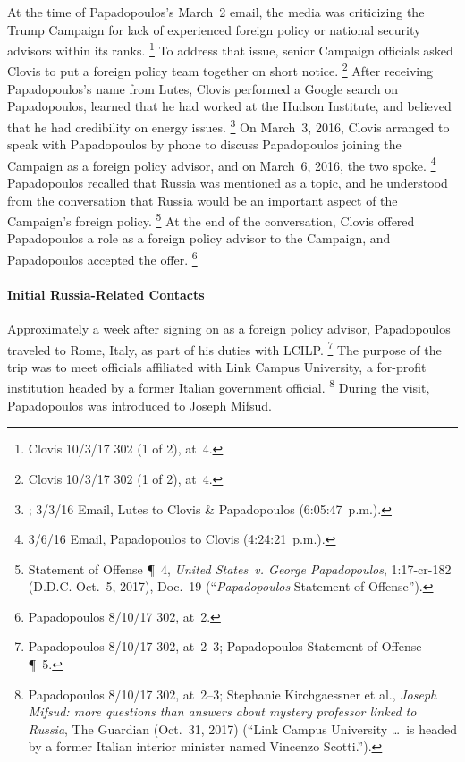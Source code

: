 At the time of Papadopoulos's March~2 email, the media was criticizing the Trump Campaign for lack of experienced foreign policy or national security advisors within its ranks.%
\footnote{Clovis 10/3/17 302 (1 of 2), at~4.}
To address that issue, senior Campaign officials asked Clovis to put a foreign policy team together on short notice.%
\footnote{Clovis 10/3/17 302 (1 of 2), at~4.}
After receiving Papadopoulos's name from Lutes, Clovis performed a Google search on Papadopoulos, learned that he had worked at the Hudson Institute, and believed that he had credibility on energy issues.%
\footnote{; 3/3/16 Email, Lutes to Clovis \& Papadopoulos (6:05:47~p.m.).}
On March~3, 2016, Clovis arranged to speak with Papadopoulos by phone to discuss Papadopoulos joining the Campaign as a foreign policy advisor, and on March~6, 2016, the two spoke.%
\footnote{3/6/16 Email, Papadopoulos to Clovis (4:24:21~p.m.).}
Papadopoulos recalled that Russia was mentioned as a topic, and he understood from the conversation that Russia would be an important aspect of the Campaign's foreign policy.%
\footnote{Statement of Offense \P~4, \textit{United States~v. George Papadopoulos}, 1:17-cr-182 (D.D.C. Oct.~5,
2017), Doc.~19 (``\textit{Papadopoulos} Statement of Offense'').}
At the end of the conversation, Clovis offered Papadopoulos a role as a foreign policy advisor to the Campaign, and Papadopoulos accepted the offer.%
\footnote{Papadopoulos 8/10/17 302, at~2.}

\paragraph{Initial Russia-Related Contacts}

Approximately a week after signing on as a foreign policy advisor, Papadopoulos traveled to Rome, Italy, as part of his duties with LCILP.%
\footnote{Papadopoulos 8/10/17 302, at~2--3; Papadopoulos Statement of Offense \P~5.}
The purpose of the trip was to meet officials affiliated with Link Campus University, a for-profit institution headed by a former Italian government official.%
\footnote{Papadopoulos 8/10/17 302, at~2--3;
Stephanie Kirchgaessner et al., \textit{Joseph Mifsud: more questions than answers about mystery professor linked to Russia}, The Guardian (Oct.~31, 2017) (``Link Campus University \dots\ is headed by a former Italian interior minister named Vincenzo Scotti.'').}
During the visit, Papadopoulos was introduced to Joseph Mifsud.

